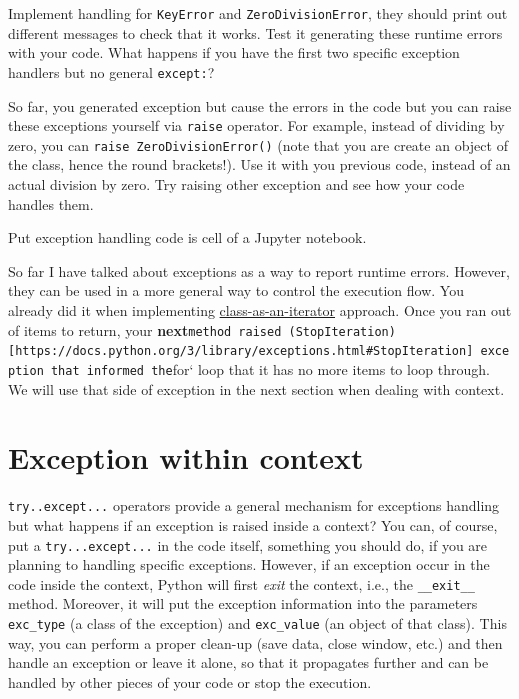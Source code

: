 \documentclass[
]{book}
\begin{document}
Implement handling for \texttt{KeyError} and \texttt{ZeroDivisionError}, they should print out different messages to check that it works. Test it generating these runtime errors with your code. What happens if you have the first two specific exception handlers but no general \texttt{except:}?

So far, you generated exception but cause the errors in the code but you can raise these exceptions yourself via \texttt{raise} operator. For example, instead of dividing by zero, you can \texttt{raise\ ZeroDivisionError()} (note that you are create an object of the class, hence the round brackets!). Use it with you previous code, instead of an actual division by zero. Try raising other exception and see how your code handles them.

Put exception handling code is cell of a Jupyter notebook.

So far I have talked about exceptions as a way to report runtime errors. However, they can be used in a more general way to control the execution flow. You already did it when implementing \href{file:///E:/Teaching/2020WS/python-for-experimental-psychology/docs/seminar-02-05.html\#duck-typiing-iterators}{class-as-an-iterator} approach. Once you ran out of items to return, your \textbf{next}\texttt{method\ raised\ (StopIteration){[}https://docs.python.org/3/library/exceptions.html\#StopIteration{]}\ exception\ that\ informed\ the}for` loop that it has no more items to loop through. We will use that side of exception in the next section when dealing with context.

\hypertarget{exception-within-context}{%
\section{Exception within context}\label{exception-within-context}}

\texttt{try..except...} operators provide a general mechanism for exceptions handling but what happens if an exception is raised inside a context? You can, of course, put a \texttt{try...except...} in the code itself, something you should do, if you are planning to handling specific exceptions. However, if an exception occur in the code inside the context, Python will first \emph{exit} the context, i.e., the \texttt{\_\_exit\_\_} method. Moreover, it will put the exception information into the parameters \texttt{exc\_type} (a class of the exception) and \texttt{exc\_value} (an object of that class). This way, you can perform a proper clean-up (save data, close window, etc.) and then handle an exception or leave it alone, so that it propagates further and can be handled by other pieces of your code or stop the execution.
\end{document}
